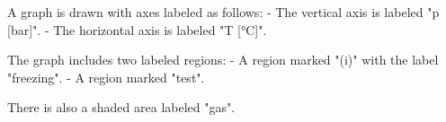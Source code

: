 A graph is drawn with axes labeled as follows:  
- The vertical axis is labeled "p [bar]".  
- The horizontal axis is labeled "T [°C]".  

The graph includes two labeled regions:  
- A region marked "(i)" with the label "freezing".  
- A region marked "test".  

There is also a shaded area labeled "gas".